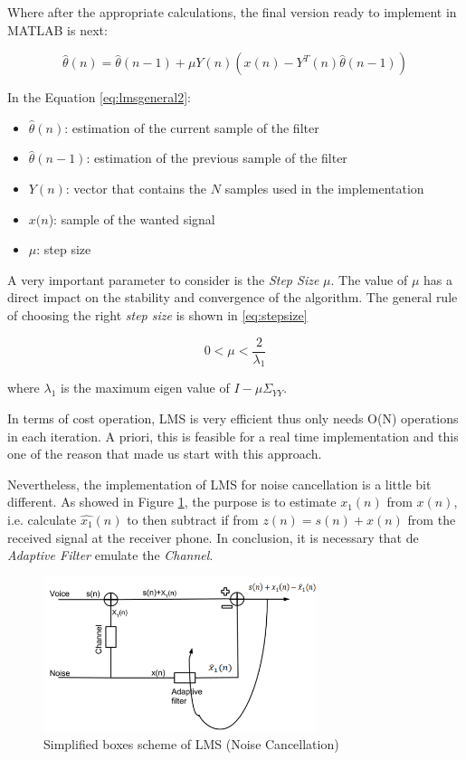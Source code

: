\documentclass[11pt,a4paper,english]{book}  %
\theoremstyle{definition}  %
\theoremstyle{plain}  %
\theoremstyle{remark}  %
\begin{document}
	Where after the appropriate calculations, the final version ready to implement in MATLAB is next:
	
	\begin{equation}
	\label{eq:lmsgeneral2}
		\hat{\theta}(n) = \hat{\theta}(n-1) + \mu Y(n)(x(n)-Y^{T}(n)\hat{\theta}(n-1))
	\end{equation}
	
	In the Equation \ref{eq:lmsgeneral2}:
	
	\begin{itemize}
	\item $\hat{\theta}(n)$: estimation of the current sample of the filter
	\item $\hat{\theta}(n-1)$: estimation of the previous sample of the filter
	\item $Y(n)$: vector that contains the $N$ samples used in the implementation
	\item $x(n$): sample of the wanted signal
	\item $\mu$: step size
	\end{itemize}
	
	A very important parameter to consider is the \textit{Step Size} $\mu$. The value of $\mu$ has a direct impact on the stability and convergence of the algorithm. The general rule of choosing the right \textit{step size} is shown in \ref{eq:stepsize}
	
	\begin{equation}
	\label{lmsmu}
	0 < \mu <\frac{2}{\lambda_{1}} 
	\end{equation}
	
	where $\lambda_{1}$ is the maximum eigen value of $I-\mu \Sigma_{YY}$.
	
	In terms of cost operation, LMS is very efficient thus only needs O(N) operations in each iteration. A priori, this is feasible for a real time implementation and this one of the reason that made us start with this approach.
	
	Nevertheless, the implementation of LMS for noise cancellation is a little bit different. As showed in Figure \ref{fig:simplms}, the purpose is to estimate $x_{1}(n)$ from $x(n)$, i.e. calculate $\hat{x_{1}}(n)$ to then subtract if from $z(n)=s(n)+x(n)$ from the received signal at the receiver phone. In conclusion, it is necessary that de \textit{Adaptive Filter} emulate the \textit{Channel}.
	
		\begin{figure}[h]
		\centering
		\includegraphics[width=8cm]{images/theory/SimplifiedLMS.jpg}
		\caption{Simplified boxes scheme of LMS (Noise Cancellation)}
		\label{fig:simplms}
		\end{figure}
		
\end{document}
